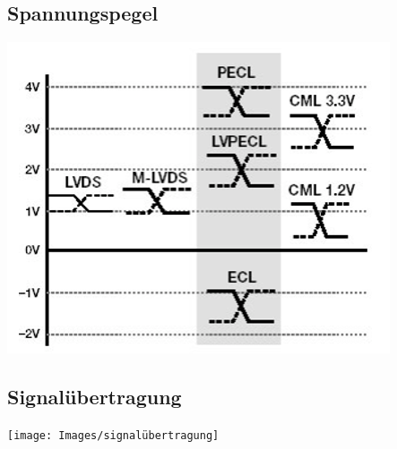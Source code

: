 \subsection{Spannungspegel}
\begin{center}
	\includegraphics[width=0.8\columnwidth]{Images/spannungspegel}
\end{center}


\subsection{Signalübertragung}
\begin{center}
	\texttt{[image: Images/signalübertragung]}
\end{center}

